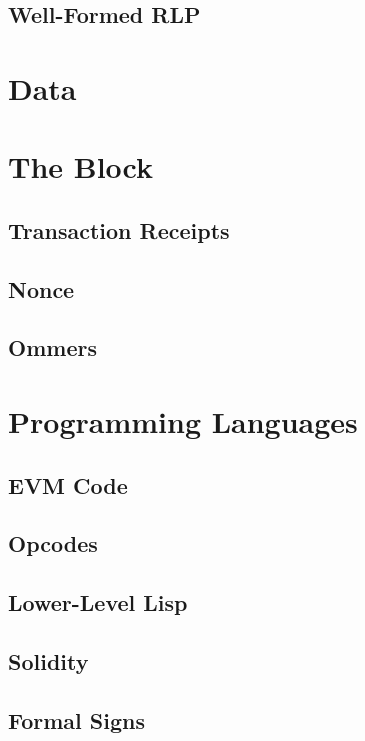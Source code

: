 \documentclass[11pt,a4paper,leqno,bibliography=totoc]{scrartcl}
\newenvironment{alphafootnotes}
{\par\edef\savedfootnotenumber{\number\value{footnote}}
\renewcommand{\thefootnote}{\alph{footnote}}
\setcounter{footnote}{0}}
{\par\setcounter{footnote}{\savedfootnotenumber}}
\begin{document}
\begin{alphafootnotes}
\begin{multicols*}{2}
	\subsection{Well-Formed RLP}

\section{Data}

\section{The Block}

\subsection{Transaction Receipts}

	\subsection{Nonce}

	\subsection{Ommers}

\section{Programming Languages}

	\subsection{EVM Code}

	\subsection{Opcodes}

	\subsection{Lower-Level Lisp}

	\subsection{Solidity}

	\subsection{Formal Signs}


\end{multicols*}
\end{alphafootnotes}
\end{document}
